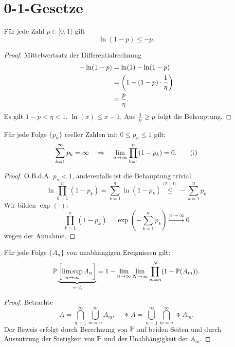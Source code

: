 \section{0-1-Gesetze}
\begin{lem}
  Für jede Zahl $p \in [0,1)$ gilt
  \[ \ln(1-p) \le -p. \]
\end{lem}

\begin{proof}
  Mittelwertsatz der Differentialrechnung
  \begin{align*}
    - \ln (1-p) &= \ln(1) - \ln(1-p) \\
                &= \left( 1 - (1-p) \cdot \frac{1}{\eta} \right) \\
                &= \frac{p}{\eta}.
  \end{align*}
  Es gilt $1-p < \eta < 1$, $\ln(x) \le x -1$. Aus $\frac{1}{\eta} \ge p$ folgt die
  Behauptung.
\end{proof}

\begin{lem}
  Für jede Folge $\{p_n\}$ reeller Zahlen mit $0 \le p_n \le 1$ gilt:
  \[ \sum_{k=1}^\infty p_k = \infty \quad \Rightarrow \quad \lim_{n \to \infty} \prod_{k=1}^n
    (1-p_k) = 0. \tag{i} \]
\end{lem}

\begin{proof}
  O.B.d.A. $p_n < 1$, anderenfalls ist die Behauptung trivial.
  \[ \ln \prod_{k=1}^n (1-p_k) = \sum_{k=1}^n \ln (1-p_k)
    \overset{\text{(2.1.1)}}{\le} - \sum_{k=1}^n p_k \]
  Wir bilden $\exp(\cdot)$:
  \[ \prod_{k=1}^n (1-p_k) = \exp \left( - \sum_{k=1}^n p_k \right)
    \xrightarrow{n \to \infty} 0 \]
  wegen der Annahme.
\end{proof}

\clearpage

\begin{lem}
  Für jede Folge $\{A_n\}$ von unabhängigen Ereignissen gilt:
  \[ \mathbb{P} \underbrace{\left[ \limsup_{n \to \infty} A_n \right]}_{=: A} = 1 -
    \lim_{n \to \infty} \lim_{N \to \infty} \prod_{m=n}^N (1-\mathbb{P}(A_m)). \]
\end{lem}

\begin{proof}
  Betrachte 
  \[ A = \bigcap_{n=1}^\infty \bigcup_{m=n}^\infty A_m,\quad \obar{A} =
    \bigcup_{n=1}^\infty \bigcap_{m=n}^\infty \obar{A_m}. \]
  Der Beweis erfolgt durch Berechnung von $\mathbb{P}$ auf beiden Seiten und durch
  Ausnutzung der Stetigkeit von $\mathbb{P}$ und der Unabhängigkeit der $A_m$.
\end{proof}

